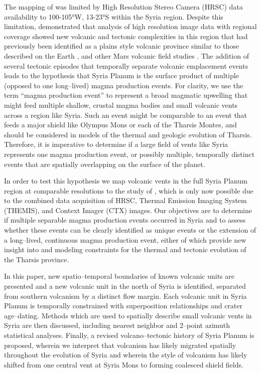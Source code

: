 \documentclass[preprint,review,authoryear,12pt]{elsarticle}
\begin{document}
The mapping of \citet{Baptista2008} was limited by High Resolution Stereo Camera (HRSC) data availability to 100-105°W, 13-23°S within the Syria region. Despite this limitation, \citet{Baptista2008} demonstrated that analysis of high resolution image data with regional coverage showed new volcanic and tectonic complexities in this region that had previously been identified as a plains style volcanic province \citep{Sakimoto2003} similar to those described on the Earth \citep{Greeley1982}, and other Mars volcanic field studies \citep{Bleacher2007,Bleacher2009,Hauber2009}. The addition of several tectonic episodes that temporally separate volcanic emplacement events leads to the hypothesis that Syria Planum is the surface product of multiple (opposed to one long--lived) magma production events. For clarity, we use the term ``magma production event'' to represent a broad magmatic upwelling that might feed multiple shallow, crustal magma bodies and small volcanic vents across a region like Syria. Such an event might be comparable to an event that feeds a major shield like Olympus Mons or each of the Tharsis Montes, and should be considered in models of the thermal and geologic evolution of Tharsis. Therefore, it is imperative to determine if a large field of vents like Syria represents one magma production event, or possibly multiple, temporally distinct events that are spatially overlapping on the surface of the planet.

In order to test this hypothesis we map volcanic vents in the full Syria Planum region at comparable resolutions to the study of \citet{Baptista2008}, which is only now possible due to the combined data acquisition of HRSC, Thermal Emission Imaging System (THEMIS), and Context Imager (CTX) images. Our objectives are to determine if multiple separable magma production events occurred in Syria and to assess whether these events can be clearly identified as unique events or the extension of a long--lived, continuous magma production event, either of which provide new insight into and modeling constraints for the thermal and tectonic evolution of the Tharsis province.

In this paper, new spatio--temporal boundaries of known volcanic units are presented and a new volcanic unit in the north of Syria is identified, separated from southern volcanism by a distinct flow margin. Each volcanic unit in Syria Planum is temporally constrained with superposition relationships and crater age--dating. Methods which are used to spatially describe small volcanic vents in Syria are then discussed, including nearest neighbor and 2--point azimuth statistical analyses. Finally, a revised volcano--tectonic history of Syria Planum is proposed, wherein we interpret that volcanism has likely migrated spatially throughout the evolution of Syria and wherein the style of volcanism has likely shifted from one central vent at Syria Mons to forming coalesced shield fields.
\end{document}
